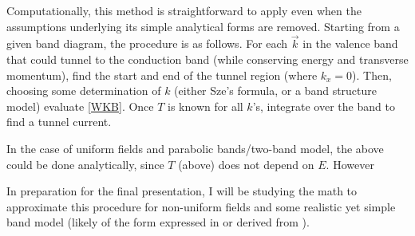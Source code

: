 Computationally, this method is straightforward to apply even when the assumptions underlying its simple analytical forms are removed.  Starting from a given band diagram, the procedure is as follows.  For each $\vec{k}$ in the valence band that could tunnel to the conduction band (while conserving energy and transverse momentum), find the start and end of the tunnel region (where $k_x=0$).  Then, choosing some determination of $k$ (either Sze's formula, or a band structure model) evaluate \ref{WKB}.  Once $T$ is known for all $k$'s, integrate over the band to find a tunnel current.



In the case of uniform fields and parabolic bands/two-band model, the above could be done analytically, since $T$ (above) does not depend on $E$.  However


In preparation for the final presentation, I will be studying the math to approximate this procedure for non-uniform fields and some realistic yet simple band model (likely of the form expressed in \cite{Guan_2011} or derived from \cite{Piprek}).